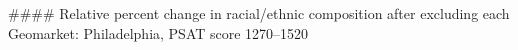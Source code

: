 #### Relative percent change in racial/ethnic composition after excluding each Geomarket: Philadelphia, PSAT score 1270–1520
